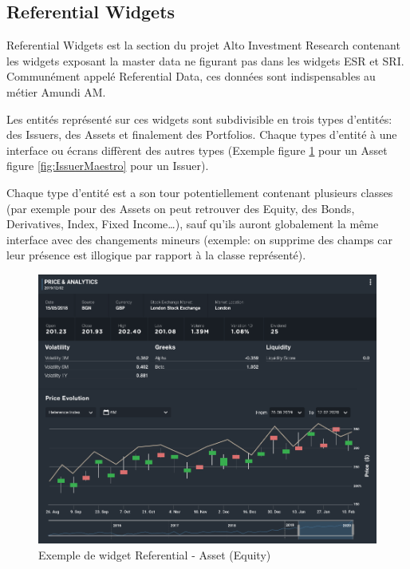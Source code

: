 \subsection{Referential Widgets}
\par Referential Widgets est la section du projet Alto Investment Research contenant les widgets exposant la master data ne figurant pas dans les widgets ESR et SRI. Communément appelé Referential Data, ces données sont indispensables au métier Amundi AM.
\par Les entités représenté sur ces widgets sont subdivisible en trois types d'entités: des Issuers, des Assets et finalement des Portfolios. Chaque types d'entité à une interface ou écrans diffèrent des autres types (Exemple figure \ref{fig:AssetInvision} pour un Asset figure \ref{fig:IssuerMaestro} pour un Issuer).
\par Chaque type d'entité est a son tour potentiellement contenant plusieurs classes (par exemple pour des Assets on peut retrouver des Equity, des Bonds, Derivatives, Index, Fixed Income\dots), sauf qu'ils auront globalement la même interface avec des changements mineurs (exemple: on supprime des champs car leur présence est illogique par rapport à la classe représenté). \\
\begin{figure}[ht]
    \centering
    \includegraphics[width=\columnwidth]{img/AssetInvision.png}
    \caption{Exemple de widget Referential - Asset (Equity)}
    \label{fig:AssetInvision}
\end{figure}
\clearpage
